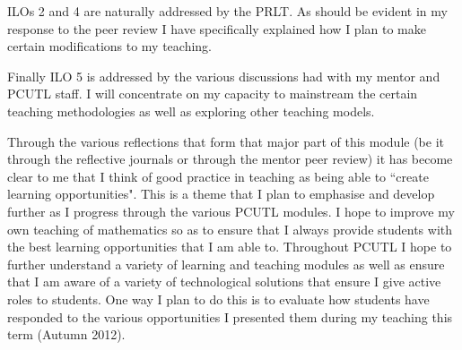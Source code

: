 \documentclass[12pt]{article}
\begin{document}
ILOs 2 and 4 are naturally addressed by the PRLT. As should be evident in my response to the peer review I have specifically explained how I plan to make certain modifications to my teaching.

Finally ILO 5 is addressed by the various discussions had with my mentor and PCUTL staff. I will concentrate on my capacity to mainstream the certain teaching methodologies as well as exploring other teaching models.

Through the various reflections that form that major part of this module (be it through the reflective journals or through the mentor peer review) it has become clear to me that I think of good practice in teaching as being able to ``create learning opportunities". This is a theme that I plan to emphasise and develop further as I progress through the various PCUTL modules. I hope to improve my own teaching of mathematics so as to ensure that I always provide students with the best learning opportunities that I am able to. Throughout PCUTL I hope to further understand a variety of learning and teaching modules as well as ensure that I am aware of a variety of technological solutions that ensure I give active roles to students. One way I plan to do this is to evaluate how students have responded to the various opportunities I presented them during my teaching this term (Autumn 2012).
\end{document}
